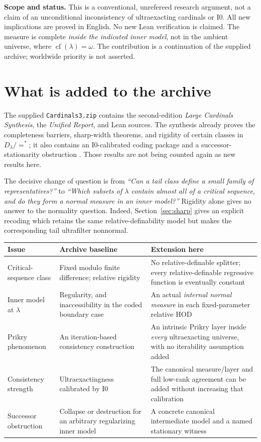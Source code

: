 \documentclass[11pt,letterpaper]{article}
\theoremstyle{definition}
\numberwithin{equation}{section}
\newcommand{\cf}{\operatorname{cf}}
\newcommand{\Izero}{\mathrm{I0}}
\begin{document}
\textbf{Scope and status.}
This is a conventional, unrefereed research argument, not a claim of an
unconditional inconsistency of ultraexacting cardinals or $\Izero$.
All new implications are proved in English. No new Lean verification is
claimed. The measure is complete \emph{inside the indicated inner model},
not in the ambient universe, where $\cf(\lambda)=\omega$.
The contribution is a continuation of the supplied archive; worldwide
priority is not asserted.

\newpage
\tableofcontents

\newpage
\section{What is added to the archive}\label{sec:delta}

The supplied \nolinkurl{Cardinals3.zip} contains the second-edition
\emph{Large Cardinals Synthesis}, the \emph{Unified Report}, and Lean
sources. The synthesis already proves the completeness barriers,
sharp-width theorems, and rigidity of certain classes in
$D_\lambda/{=^*}$; it also contains an $\Izero$-calibrated coding package
and a successor-stationarity obstruction \cite{synthesis,plan}.
Those results are not being counted again as new results here.

The decisive change of question is from
\emph{``Can a tail class define a small family of representatives?''}
to
\emph{``Which subsets of $\lambda$ contain almost all of a critical
sequence, and do they form a normal measure in an inner model?''}
Rigidity alone gives no answer to the normality question.
Indeed, Section~\ref{sec:sharp} gives an explicit recoding which retains
the same relative-definability model but makes the corresponding tail
ultrafilter nonnormal.

\begin{center}
\small
\renewcommand{\arraystretch}{1.19}
\begin{tabularx}{\textwidth}{@{}P{.27\textwidth}YY@{}}
\toprule
\textbf{Issue}&\textbf{Archive baseline}&\textbf{Extension here}\\\midrule
Critical-sequence class&Fixed modulo finite difference; relative rigidity&No relative-definable splitter; every relative-definable regressive function is eventually constant\\
Inner model at $\lambda$&Regularity, and inaccessibility in the coded boundary case&An actual \emph{internal normal measure} in each fixed-parameter relative HOD\\
Prikry phenomenon&An iteration-based consistency construction&An intrinsic Prikry layer inside \emph{every} ultraexacting universe, with no iterability assumption added\\
Consistency strength&Ultraexactingness calibrated by $\Izero$&The canonical measure/layer and full low-rank agreement can be added without increasing that calibration\\
Successor obstruction&Collapse or destruction for an arbitrary regularizing inner model&A concrete canonical intermediate model and a named stationary witness\\
\bottomrule
\end{tabularx}
\end{center}
\end{document}
